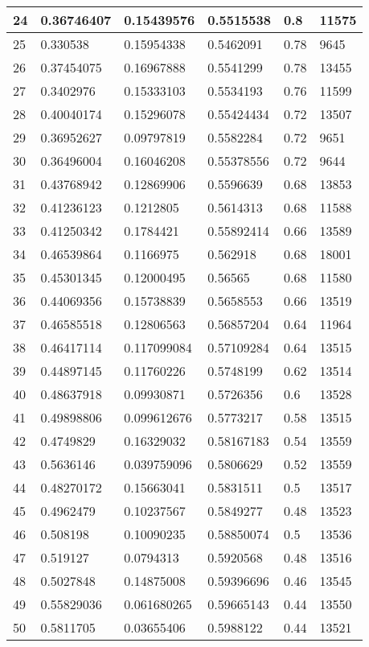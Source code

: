 \begin{longtable}{|l|l|l|l|l|l|}
24 & 0.36746407 & 0.15439576 & 0.5515538 & 0.8 & 11575 \\ \hline 
25 & 0.330538 & 0.15954338 & 0.5462091 & 0.78 & 9645 \\ \hline 
26 & 0.37454075 & 0.16967888 & 0.5541299 & 0.78 & 13455 \\ \hline 
27 & 0.3402976 & 0.15333103 & 0.5534193 & 0.76 & 11599 \\ \hline 
28 & 0.40040174 & 0.15296078 & 0.55424434 & 0.72 & 13507 \\ \hline 
29 & 0.36952627 & 0.09797819 & 0.5582284 & 0.72 & 9651 \\ \hline 
30 & 0.36496004 & 0.16046208 & 0.55378556 & 0.72 & 9644 \\ \hline 
31 & 0.43768942 & 0.12869906 & 0.5596639 & 0.68 & 13853 \\ \hline 
32 & 0.41236123 & 0.1212805 & 0.5614313 & 0.68 & 11588 \\ \hline 
33 & 0.41250342 & 0.1784421 & 0.55892414 & 0.66 & 13589 \\ \hline 
34 & 0.46539864 & 0.1166975 & 0.562918 & 0.68 & 18001 \\ \hline 
35 & 0.45301345 & 0.12000495 & 0.56565 & 0.68 & 11580 \\ \hline 
36 & 0.44069356 & 0.15738839 & 0.5658553 & 0.66 & 13519 \\ \hline 
37 & 0.46585518 & 0.12806563 & 0.56857204 & 0.64 & 11964 \\ \hline 
38 & 0.46417114 & 0.117099084 & 0.57109284 & 0.64 & 13515 \\ \hline 
39 & 0.44897145 & 0.11760226 & 0.5748199 & 0.62 & 13514 \\ \hline 
40 & 0.48637918 & 0.09930871 & 0.5726356 & 0.6 & 13528 \\ \hline 
41 & 0.49898806 & 0.099612676 & 0.5773217 & 0.58 & 13515 \\ \hline 
42 & 0.4749829 & 0.16329032 & 0.58167183 & 0.54 & 13559 \\ \hline 
43 & 0.5636146 & 0.039759096 & 0.5806629 & 0.52 & 13559 \\ \hline 
44 & 0.48270172 & 0.15663041 & 0.5831511 & 0.5 & 13517 \\ \hline 
45 & 0.4962479 & 0.10237567 & 0.5849277 & 0.48 & 13523 \\ \hline 
46 & 0.508198 & 0.10090235 & 0.58850074 & 0.5 & 13536 \\ \hline 
47 & 0.519127 & 0.0794313 & 0.5920568 & 0.48 & 13516 \\ \hline 
48 & 0.5027848 & 0.14875008 & 0.59396696 & 0.46 & 13545 \\ \hline 
49 & 0.55829036 & 0.061680265 & 0.59665143 & 0.44 & 13550 \\ \hline 
50 & 0.5811705 & 0.03655406 & 0.5988122 & 0.44 & 13521 \\ \hline 
\end{longtable}